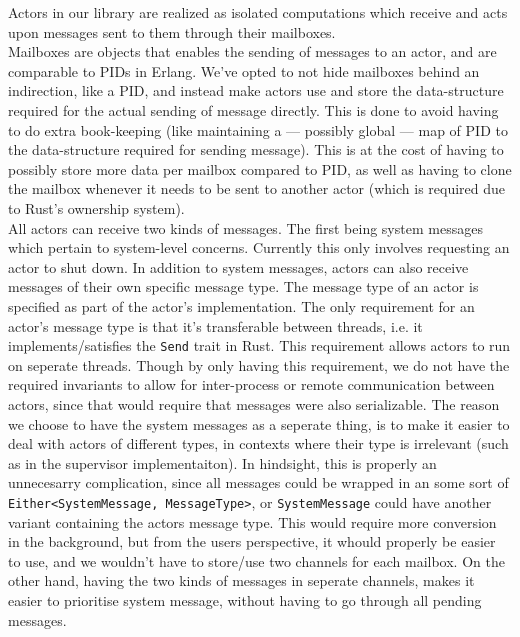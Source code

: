 \documentclass[a4paper]{article}
\begin{document}
\noindent
Actors in our library are realized as isolated computations %
which receive and acts upon messages sent to them through their mailboxes.\\

\noindent
Mailboxes are objects that enables the sending of messages to an actor, and are
comparable to PIDs in Erlang. We've opted to not hide mailboxes behind an
indirection, like a PID, and instead make actors use and store the
data-structure required for the actual sending of message directly. This is done
to avoid having to do extra book-keeping (like maintaining a --- possibly global
--- map of PID to the data-structure required for sending message). This is at
the cost of having to possibly store more data per mailbox compared to PID, as
well as having to clone the mailbox whenever it needs to be sent to another
actor (which is required due to Rust's ownership system).\\

\noindent
All actors can receive two kinds of messages. The first being system messages
which pertain to system-level concerns. Currently this only involves requesting
an actor to shut down. In addition to system messages, actors can also
receive messages of their own specific message type. The message type of an
actor is specified as part of the actor's implementation. The only requirement
for an actor's message type is that it's transferable between threads, i.e. it
implements/satisfies the \texttt{Send} trait in Rust. This requirement allows
actors to run on seperate threads. Though by only having this requirement, we do
not have the required invariants to allow for inter-process or remote
communication between actors, since that would require that messages were also
serializable. The reason we choose to have the system messages as a seperate
thing, is to make it easier to deal with actors of different types, in contexts
where their type is irrelevant (such as in the supervisor implementaiton). In
hindsight, this is properly an unnecesarry complication, since all messages
could be wrapped in an some sort of \texttt{Either<SystemMessage, MessageType>},
or \texttt{SystemMessage} could have another variant containing the actors
message type. This would require more conversion in the background, but from the
users perspective, it whould properly be easier to use, and we wouldn't have to
store/use two channels for each mailbox. On the other hand, having the two kinds
of messages in seperate channels, makes it easier to prioritise system message,
without having to go through all pending messages.\\
\end{document}
